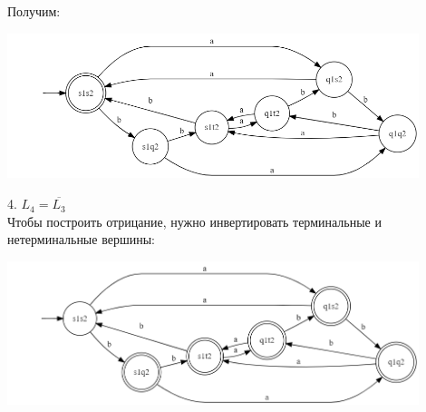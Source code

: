 \documentclass{article}
\begin{document}
    Получим:
    \begin{center}
        \includegraphics[width=0.9\textwidth]{task2/pic3.3}
    \end{center}
    
    
    4. $L_4 = \overline{L_3}$\\
    Чтобы построить отрицание, нужно инвертировать терминальные и нетерминальные вершины:
    \begin{center}
        \includegraphics[width=0.9\textwidth]{task2/pic3.4}
    \end{center}
    
\end{document}
